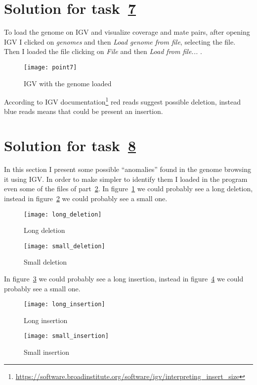 \section{Solution for task~\hyperref[itm:1.7]{7}}
To load the genome on IGV and visualize coverage and mate pairs, after opening 
IGV I clicked on \textit{genomes} and then \textit{Load genome from file},
selecting the  file. Then I loaded
the  file clicking on \textit{File} and then 
\textit{Load from file...} .
\begin{figure}[H]
\texttt{[image: point7]}
\caption{IGV with the genome loaded}
\end{figure}
According to IGV documentation\footnote{
\url{https://software.broadinstitute.org/software/igv/interpreting_insert_size}}
red reads suggest possible deletion, instead blue reads means that could be
present an insertion.

\section{Solution for task~\hyperref[itm:1.8]{8}}
In this section I present some possible ``anomalies'' found in the genome
browsing it using IGV. In order to make simpler to identify them I loaded in
the program even some of the  files of part~\hyperref[chp:part2]{2}.
In figure~\ref{fig:longdel} we could probably see a long deletion, instead in
figure~\ref{fig:smalldel} we could probably see a small one.
\begin{figure}[H]
\texttt{[image: long\_deletion]}
\caption{Long deletion}
\label{fig:longdel}
\end{figure}

\begin{figure}[H]
\texttt{[image: small\_deletion]}
\caption{Small deletion}
\label{fig:smalldel}
\end{figure}

In figure~\ref{fig:longins} we could probably see a long insertion, instead in
figure~\ref{fig:smallins} we could probably see a small one.
\begin{figure}[H]
\texttt{[image: long\_insertion]}
\caption{Long insertion}
\label{fig:longins}
\end{figure}

\begin{figure}[H]
\texttt{[image: small\_insertion]}
\caption{Small insertion}
\label{fig:smallins}
\end{figure}